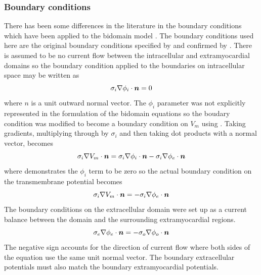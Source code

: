 \subsubsection{Boundary conditions}
There has been some differences in the literature in the boundary conditions
which have been applied to the bidomain model . The boundary
conditions used here are the original boundary conditions specified
by  and confirmed by . There is assumed to be no
current flow between the intracellular and extramyocardial domains so the
boundary condition applied to the boundaries on intracellular space may be
written as
\begin{equation}
  \dotprod{\sigma_i \grad \phi_i}{\vect{n}}=0
  \label{eqn:orig_int_bc}
\end{equation}
where $n$ is a unit outward normal vector. The $\phi_i$ parameter was not
explicitly represented in the formulation of 
the bidomain equations so the boudary condition was modified to become a
boundary condition on $V_m$ using . Taking
gradients, multiplying through by $\sigma_i$ and then taking dot products with
a normal vector, 
 becomes
\begin{equation}
  \dotprod{\sigma_i \grad V_m}{\vect{n}} = \dotprod{\sigma_i \grad \phi_i}{\vect{n}} -
  \dotprod{\sigma_i \grad \phi_e}{\vect{n}} 
\end{equation}
where  demonstrates the $\phi_i$ term to be zero so
the actual boundary condition on the transmembrane potential becomes
\begin{equation}
  \dotprod{\sigma_i \grad V_m}{\vect{n}} = -\dotprod{\sigma_i \grad \phi_e}{\vect{n}} 
  \label{eqn:actual_int_bc}
\end{equation}
The boundary conditions on the extracellular domain were set up as a current
balance between the domain and the surrounding extramyocardial regions. 
\begin{equation}
  \dotprod{\sigma_e \grad \phi_e}{\vect{n}}=-\dotprod{\sigma_o \grad \phi_o}{\vect{n}}
  \label{eqn:orig_ext_bc}
\end{equation}
The negative sign accounts for the direction of current flow where both sides
of the equation use the same unit normal vector. The boundary extracellular
potentials must also match the boundary extramyocardial potentials. 
